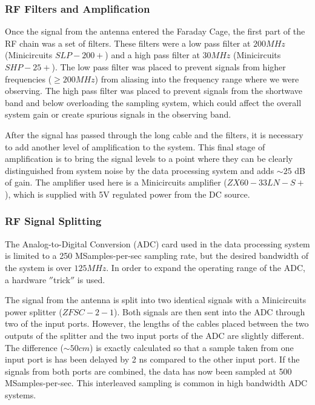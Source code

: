 \subsubsection{RF Filters and Amplification} \label{Sec:fcage_elec}

Once the signal from the antenna entered the Faraday Cage, the first part of the RF chain was a set of filters. These filters were a low pass filter at $200 MHz$ (Minicircuits $SLP-200+$) and a high pass filter at $30 MHz$ (Minicircuits $SHP-25+$). The low pass filter was placed to prevent signals from higher frequencies ($\geq 200 MHz$) from aliasing into the frequency range where we were observing. The high pass filter was placed to prevent signals from the shortwave band and below overloading the sampling system, which could affect the overall system gain or create spurious signals in the observing band. 

After the signal has passed through the long cable and the filters, it is necessary to add another level of amplification to the system. This final stage of amplification is to bring the signal levels to a point where they can be clearly distinguished from system noise by the data processing system and adds $\sim25$ dB of gain. The amplifier used here is a Minicircuits amplifier ($ZX60-33LN-S+$), which is supplied with 5V regulated power from the DC source. 

\subsubsection{RF Signal Splitting} \label{Sec:hard_split}

The Analog-to-Digital Conversion (ADC) card used in the data processing system is limited to a 250 MSamples-per-sec sampling rate, but the desired bandwidth of the system is over $125 MHz$. In order to expand the operating range of the ADC, a hardware $''$trick$''$ is used.

The signal from the antenna is split into two identical signals with a Minicircuits power splitter ($ZFSC-2-1$). Both signals are then sent into the ADC through two of the input ports. However, the lengths of the cables placed between the two outputs of the splitter and the two input ports of the ADC are slightly different. The difference ($\sim 50 cm$) is exactly calculated so that a sample taken from one input port is has been delayed by 2 ns compared to the other input port. If the signals from both ports are combined, the data has now been sampled at 500 MSamples-per-sec. This interleaved sampling is common in high bandwidth ADC systems. 

